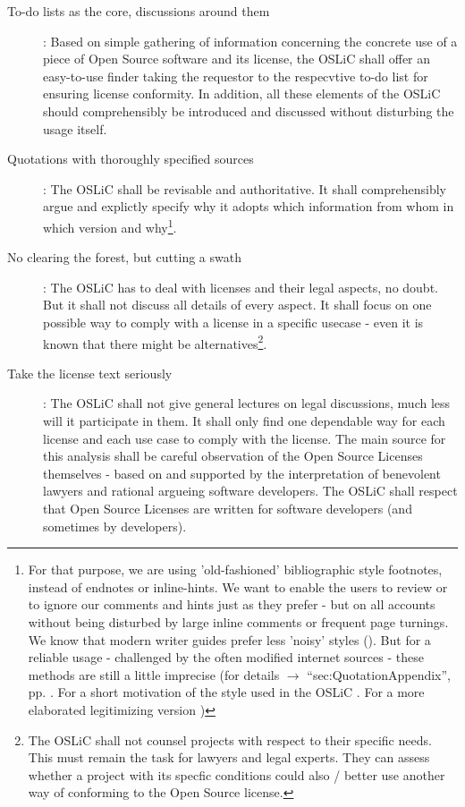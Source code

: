 \begin{description}
  \item[To-do lists as the core, discussions around them]: Based on simple
  gathering of information concerning the concrete use of a piece of Open Source
  software and its license, the OSLiC shall offer an easy-to-use finder taking
  the requestor to the respecvtive to-do list for ensuring license conformity.
  In addition, all these elements of the OSLiC should comprehensibly be
  introduced and discussed without disturbing the usage itself.

  \item[Quotations with thoroughly specified sources]\label{QuotationPrinciple}:
  The OSLiC shall be revisable and authoritative. It shall comprehensibly argue
  and explictly specify why it adopts which information from whom in which
  version and why\footnote{For that purpose, we are using 'old-fashioned'
  bibliographic style footnotes, instead of endnotes or inline-hints.
  We want to enable the users to review or to ignore our comments and hints just
  as they prefer - but on all accounts without being disturbed by large inline
  comments or frequent page turnings. We know that modern writer guides prefer
  less 'noisy' styles (\cite[pars pro toto cf.][\nopage passim]{Mla2009a}). But
  for a reliable usage - challenged by the often modified internet sources -
  these methods are still a little imprecise (for details $\rightarrow$
  \enquote{sec:QuotationAppendix}, pp. \pageref{sec:QuotationAppendix} . For a
  short motivation of the style used in the OSLiC \cite[cf.][\nopage
  passim]{Reincke2012a}. For a more elaborated legitimizing version
  \cite[cf.][\nopage passim]{Reincke2012b}) }.

 \item[No clearing the forest, but cutting a swath]: The OSLiC
  has to deal with licenses and their legal aspects, no doubt. But it shall not
  discuss all details of every aspect. It shall focus on one possible way to
  comply with a license in a specific usecase - even it is known that there
  might be alternatives\footnote{The OSLiC shall not counsel projects with
  respect to their specific needs. This must remain the task for lawyers and
  legal experts. They can assess whether a project with its specfic conditions
  could also / better use another way of conforming to the Open Source
  license.}.
  
  \item[Take the license text seriously]: The OSLiC shall not give general
  lectures on legal discussions, much less will it participate in them. It shall
  only find one dependable way for each license and each use case to comply with
  the license. The main source for this analysis shall be careful observation of
  the Open Source Licenses themselves - based on and supported by the
  interpretation of benevolent lawyers and rational argueing software
  developers. The OSLiC shall respect that Open Source Licenses are written for
  software developers (and sometimes by developers).
  

\end{description}
